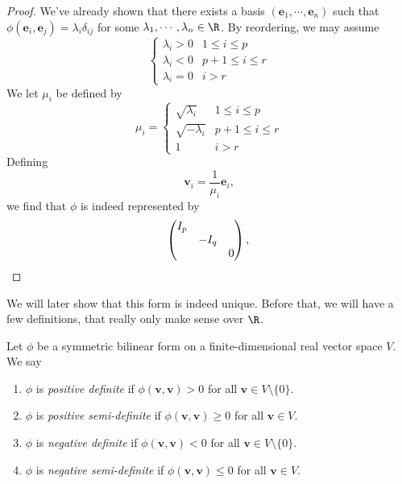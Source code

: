 \documentclass[a4paper]{article}
\begin{document}
\begin{proof}
  We've already shown that there exists a basis $(\mathbf{e}_1, \cdots, \mathbf{e}_n)$ such that $\phi(\mathbf{e}_i, \mathbf{e}_j) = \lambda_i \delta_{ij}$ for some $\lambda_1, \cdots, \lambda_n \in \R$. By reordering, we may assume
  \[
    \begin{cases}
      \lambda_i > 0 & 1 \leq i \leq p\\
      \lambda_i < 0 & p + 1 \leq i \leq r\\
      \lambda_i = 0 & i > r
    \end{cases}
  \]
  We let $\mu_i$ be defined by
  \[
    \mu_i =
    \begin{cases}
      \sqrt{\lambda_i} & 1 \leq i \leq p\\
      \sqrt{-\lambda_i} & p + 1 \leq i \leq r\\
      1 & i > r
    \end{cases}
  \]
  Defining
  \[
    \mathbf{v}_i = \frac{1}{\mu_i}\mathbf{e}_i,
  \]
  we find that $\phi$ is indeed represented by
  \[
    \begin{pmatrix}
      I_p\\
      & -I_q\\
      & & 0
    \end{pmatrix},\qedhere
  \]
\end{proof}
We will later show that this form is indeed unique. Before that, we will have a few definitions, that really only make sense over $\R$.

\begin{defi}
  Let $\phi$ be a symmetric bilinear form on a finite-dimensional real vector space $V$. We say
  \begin{enumerate}
    \item $\phi$ is \emph{positive definite} if $\phi(\mathbf{v}, \mathbf{v}) > 0$ for all $\mathbf{v} \in V\setminus \{0\}$.
    \item $\phi$ is \emph{positive semi-definite} if $\phi(\mathbf{v}, \mathbf{v}) \geq 0$ for all $\mathbf{v} \in V$.
    \item $\phi$ is \emph{negative definite} if $\phi(\mathbf{v}, \mathbf{v}) < 0$ for all $\mathbf{v} \in V\setminus \{0\}$.
    \item $\phi$ is \emph{negative semi-definite} if $\phi(\mathbf{v}, \mathbf{v}) \leq 0$ for all $\mathbf{v} \in V$.
  \end{enumerate}
\end{defi}
\end{document}

